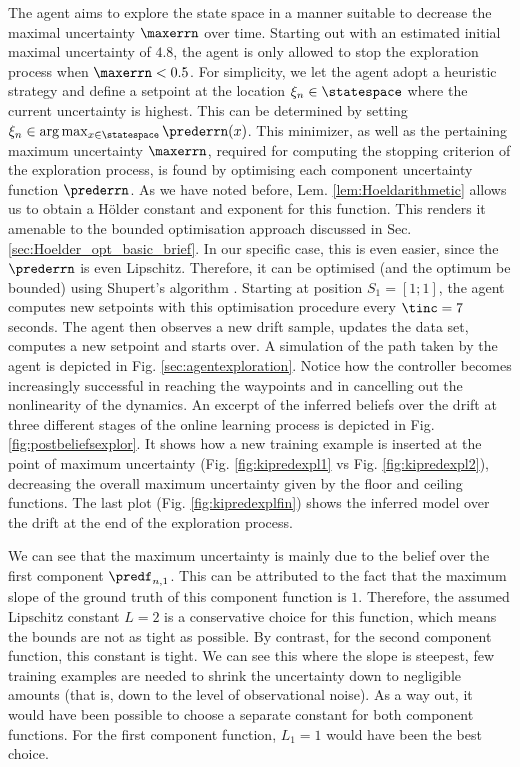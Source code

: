 The agent aims to explore the state space in a manner suitable to decrease the maximal uncertainty $\maxerrn$ over time. Starting out with an estimated initial maximal uncertainty of $4.8$, the agent is only allowed to stop the exploration process when $\maxerrn < 0.5$. 
For simplicity, we let the agent adopt a heuristic strategy and define a setpoint at the location $\xi_n \in \statespace$ where the current uncertainty is highest. This can be determined by setting $\xi_n \in \arg\max_{x \in \statespace } \prederrn(x)$. This minimizer, as well as the pertaining maximum uncertainty $\maxerrn$, required for computing the stopping criterion of the exploration process, is found by optimising each component uncertainty function $\prederrn$. As we have noted before, Lem. \ref{lem:Hoeldarithmetic} allows us to obtain a H\"older constant and exponent for this function. This renders it amenable to the bounded optimisation approach discussed in Sec. \ref{sec:Hoelder_opt_basic_brief}. In our specific case, this is even easier, since the $\prederrn$ is even Lipschitz. Therefore, it can be optimised (and the optimum be bounded) using Shupert's algorithm \cite{Shubert:72}.  
Starting at position $S_1 = [1;1]$, the agent computes new setpoints with this optimisation procedure every $\tinc = 7$ seconds. The agent then observes a new drift sample, updates the data set, computes a new setpoint and starts over.  A simulation of the path taken by the agent is depicted in Fig. \ref{sec:agentexploration}. Notice how the controller becomes increasingly successful in reaching the waypoints  and in cancelling out the nonlinearity of the dynamics. An excerpt of the inferred beliefs over the drift at three different stages of the online learning process is depicted in Fig. \ref{fig:postbeliefsexplor}. It shows how a new training example is inserted at the point of maximum uncertainty (Fig. \ref{fig:kipredexpl1} vs Fig. \ref{fig:kipredexpl2}), decreasing the overall maximum uncertainty given by the floor and ceiling functions. The last plot (Fig. \ref{fig:kipredexplfin}) shows the inferred model over the drift at the end of the exploration process. 
\begin{rem}
We can see that the maximum uncertainty is mainly due to the belief over the first component $\predf_{n,1}$. This can be attributed to the fact that the maximum slope of the ground truth of this component function is $1$. Therefore, the assumed Lipschitz constant $L=2$ is a conservative choice for this function, which means the bounds are not as tight as possible. By contrast, for the second component function, this constant is tight. We can see this where the slope is steepest, few training examples are needed to shrink the uncertainty down to negligible amounts (that is, down to the level of observational noise). As a way out, it would have been possible to choose a separate constant for both component functions. For the first component function, $L_1=1$ would have been the best choice. 
\end{rem}

